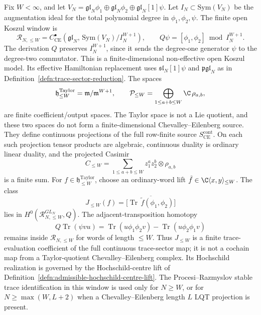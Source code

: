 \begin{ex}\label{exa:finite-window-admissible-model}
  Fix \(W<\infty\), and let
  \(V_N=\mathfrak{gl}_N\phi_1\oplus\mathfrak{gl}_N\phi_2
  \oplus\mathfrak{gl}_N[1]\psi\).  Let
  \(I_N\subset\mathrm{Sym}(V_N)\) be the augmentation ideal for the
  total polynomial degree in \(\phi_1,\phi_2,\psi\).  The finite open
  Koszul window is
  \[
    \mathcal R_{N,\leq W}
    =
    C^\bullet_{\mathrm{CE}}\!\left(
      \mathfrak{gl}_N,\,
      \mathrm{Sym}(V_N)/I_N^{W+1}\right),
    \qquad
    Q\psi=[\phi_1,\phi_2]\bmod I_N^{W+1}.
  \]
  The derivation \(Q\) preserves \(I_N^{W+1}\), since it sends the
  degree-one generator \(\psi\) to the degree-two commutator.  This is
  a finite-dimensional non-effective open Koszul model.  Its effective
  Hamiltonian replacement uses \(\mathfrak{sl}_N[1]\psi\) and
  \(\mathfrak{pgl}_N\) as in
  Definition~\ref{defn:trace-sector-reduction}.  The spaces
  \[
    \mathfrak h^{\mathrm{Taylor}}_{\leq W}=\mathfrak m/\mathfrak m^{W+1},\qquad
    \mathcal P_{\leq W}=\bigoplus_{1\leq a+b\leq W}\C\,\rho_{a,b},
  \]
  are finite coefficient/output spaces.  The Taylor space is not a Lie
  quotient, and these two spaces do not form a finite-dimensional
  Chevalley--Eilenberg source.  They define continuous projections of
  the full row-finite source
  \(S_{\mathrm{CE}}^{\mathrm{cont}}\).  On each such projection tensor
  products are algebraic, continuous duality is ordinary linear
  duality, and the projected Casimir
  \[
    C_{\leq W}=
    \sum_{1\leq a+b\leq W}z_1^az_2^b\otimes\rho_{a,b}
  \]
  is a finite sum.  For \(f\in\mathfrak h^{\mathrm{Taylor}}_{\leq W}\), choose an
  ordinary-word lift \(\tilde f\in\C\langle x,y\rangle_{\leq W}\).  The
  class
  \[
    J_{\leq W}(f)
    =
    \bigl[
      \overline{\operatorname{Tr}\,\tilde f(\phi_1,\phi_2)}
    \bigr]
  \]
  lies in
  \(H^0(\mathcal R_{N,\leq W}^{GL_N},Q)\).  The adjacent-transposition
  homotopy
  \[
    Q\operatorname{Tr}(\psi vu)
    =
    \operatorname{Tr}(u\phi_1\phi_2v)
    -\operatorname{Tr}(u\phi_2\phi_1v)
  \]
  remains inside \(\mathcal R_{N,\leq W}\) for words of length
  \(\leq W\).  Thus \(J_{\leq W}\) is a finite trace-evaluation
  coefficient of the full continuous trace-sector map; it is not a
  cochain map from a Taylor-quotient Chevalley--Eilenberg complex.  Its
  Hochschild realization is governed by the Hochschild-centre lift of
  Definition~\ref{defn:admissible-hochschild-centre-lift}.  The
  Procesi--Razmyslov stable trace identification in this window is used
  only for \(N\geq W\), or for \(N\geq\max(W,L+2)\) when a
  Chevalley--Eilenberg length \(L\) LQT projection is present.
\end{ex}

